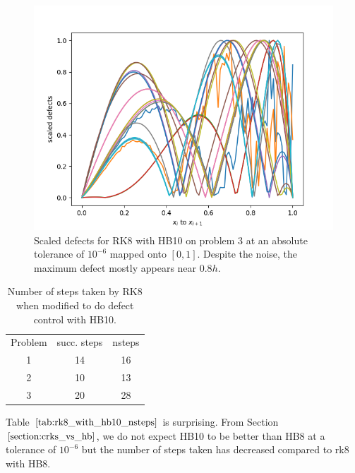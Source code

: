 \begin{figure}[H]
\centering
\includegraphics[width=0.7\linewidth]{./figures/rk8_with_hb10_p3_scaled_defects}
\caption{Scaled defects for RK8 with HB10 on problem 3 at an absolute tolerance of $10^{-6}$  mapped onto $[0, 1]$. Despite the noise, the maximum defect mostly appears near $0.8h$.}
\label{fig:rk8_with_hb10_p3_scaled_defects}
\end{figure}

\begin{table}[h]
\caption {Number of steps taken by RK8 when modified to do defect control with HB10.} \label{tab:rk8_with_hb10_nsteps}
\begin{center}
\begin{tabular}{ c c c } 
Problem & succ. steps & nsteps \\ 
1       & 14             &        16 \\ 
2       & 10             &        13 \\
3       & 20             &        28 \\
\end{tabular}
\end{center}
\end{table}

Table $\ref{tab:rk8_with_hb10_nsteps}$ is surprising. From Section $\ref{section:crks_vs_hb}$, we do not expect HB10 to be better than HB8 at a tolerance of $10^{-6}$ but the number of steps taken has decreased compared to rk8 with HB8.